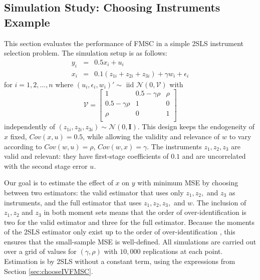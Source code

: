 \documentclass[12pt]{article}
\theoremstyle{definition}
\begin{document}
\subsection{Simulation Study: Choosing Instruments Example}\label{sec:fmscsim}
This section evaluates the performance of FMSC in a simple 2SLS instrument selection problem. The simulation setup is as follows:
\begin{eqnarray}
		\label{eq:secondstage}
		y_i &=& 0.5 x_i + u_i\\ 
		x_i &=& 0.1 (z_{1i} + z_{2i} + z_{3i}) + \gamma w_i + \epsilon_i 
		\label{eq:firststage}
	\end{eqnarray}
for $i=1, 2, \hdots, n$ where $(u_i, \epsilon_i, w_i)' \sim \mbox{ iid  } \mathcal{N}(0,\mathcal{V})$ with	
\begin{equation}
			\label{eq:varmatrix}
			\mathcal{V} = \left[  
				\begin{array}{cccc}
					1 & 0.5 - \gamma\rho & \rho\\
					0.5 - \gamma \rho & 1 & 0\\
					\rho & 0 & 1 \\
				\end{array}
		\right]
\end{equation}	
independently of $(z_{1i}, z_{2i}, z_{3i})\sim \mathcal{N}(0, \mathbf{I})$. This design keeps the endogeneity of $x$ fixed, $Cov(x,u) = 0.5$, while allowing the validity and relevance of $w$ to vary according to $Cov(w,u) =\rho$, $Cov(w,x) = \gamma$. The instruments $z_1, z_2, z_3$ are valid and relevant: they have first-stage coefficients of $0.1$ and are uncorrelated with the second stage error $u$. 

Our goal is to estimate the effect of $x$ on $y$ with minimum MSE by choosing between two estimators: the valid estimator that uses only $z_1, z_2,$ and $z_3$ as instruments, and the full estimator that uses $z_1, z_2, z_3,$ and $w$. The inclusion of $z_1, z_2$ and $z_3$ in both moment sets means that the order of over-identification is two for the valid estimator and three for the full estimator. Because the moments of the 2SLS estimator only exist up to the order of over-identification \citep{Phillips1980}, this ensures that the small-sample MSE is well-defined. All simulations are carried out over a grid of values for $(\gamma, \rho)$ with $10,000$ replications at each point. Estimation is by 2SLS without a constant term, using the expressions from Section \ref{sec:chooseIVFMSC}.
\end{document}
